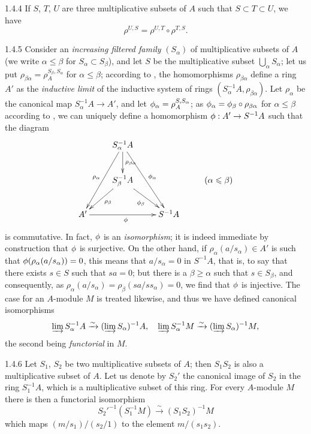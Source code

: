 \documentclass[10pt,oneside]{book}
\begin{document}
\begin{env}{1.4.4}
\label{env-0.1.4.4}
If $S$, $T$, $U$ are three multiplicative subsets of $A$ such that $S\subset T\subset U$, we
have
\[
  \rho^{U,S}=\rho^{U,T}\circ\rho^{T,S}.
\]
\end{env}

\begin{env}{1.4.5}
\label{env-0.1.4.5}
Consider an \emph{increasing filtered family} $(S_\alpha)$ of multiplicative subsets of $A$
(we write $\alpha\leqslant\beta$ for $S_\alpha\subset S_\beta$), and let $S$ be the
multiplicative subset $\bigcup_\alpha S_\alpha$; let us put
$\rho_{\beta\alpha}=\rho_A^{S_\beta,S_\alpha}$ for $\alpha\leq\beta$; according to
, the homomorphisms $\rho_{\beta\alpha}$ define a ring $A'$ as the
\emph{inductive limit} of the inductive system of rings
$(S_\alpha^{-1}A,\rho_{\beta\alpha})$. Let $\rho_\alpha$ be the canonical map
$S_\alpha^{-1}A\to A'$, and let $\phi_\alpha=\rho_A^{S,S_\alpha}$; as
$\phi_\alpha=\phi_\beta\circ\rho_{\beta\alpha}$ for $\alpha\leqslant\beta$ according to
, we can uniquely define a homomorphism $\phi:A'\to S^{-1}A$ such that the
diagram
\[
  \xymatrix{
    & S_\alpha^{-1}A\ar[ddl]_{\rho_\alpha}
                    \ar[d]^{\rho_{\beta\alpha}}
                    \ar[rdd]^{\vphi_\alpha}\\
    & S_\beta^{-1}A\ar[ld]^{\rho_\beta}
                   \ar[rd]_{\vphi_\beta}
    & & (\alpha\leqslant\beta)\\
    A'\ar[rr]_\vphi
    & & S^{-1}A
  }
\]
is commutative. In fact, $\phi$ is an \emph{isomorphism}; it is indeed immediate by
construction that $\phi$ is surjective. On the other hand, if
$\rho_\alpha(a/s_\alpha)\in A'$ is such that ${\phi(\rho_\alpha(a/s_\alpha))=0}$, this means
that $a/s_\alpha=0$ in $S^{-1}A$, that is, to say that there exists $s\in S$ such that
$sa=0$; but there is a $\beta\geqslant\alpha$ such that $s\in S_\beta$, and consequently, as
$\rho_\alpha(a/s_\alpha)=\rho_\beta(sa/ss_\alpha)=0$, we find that $\phi$ is injective.
The case for an $A$-module $M$ is treated likewise, and thus we have defined canonical
isomorphisms
\[
  \varinjlim S_\alpha^{-1}A\xrightarrow{\sim}(\varinjlim S_\alpha)^{-1}A,\quad
  \varinjlim S_\alpha^{-1}M\xrightarrow{\sim}(\varinjlim S_\alpha)^{-1}M,
\]
the second being \emph{functorial} in $M$.
\end{env}

\begin{env}{1.4.6}
\label{env-0.1.4.6}
Let $S_1$, $S_2$ be two multiplicative subsets of $A$; then $S_1 S_2$ is also a
multiplicative subset of $A$. Let us denote by $S_2'$ the canonical image of $S_2$ in the
ring $S_1^{-1}A$, which is a multiplicative subset of this ring. For every $A$-module $M$
there is then a functorial isomorphism
\[
  {S_2'}^{-1}(S_1^{-1}M)\xrightarrow{\sim}(S_1 S_2)^{-1}M
\]
which maps $(m/s_1)/(s_2/1)$ to the element $m/(s_1 s_2)$.
\end{env}
\end{document}
